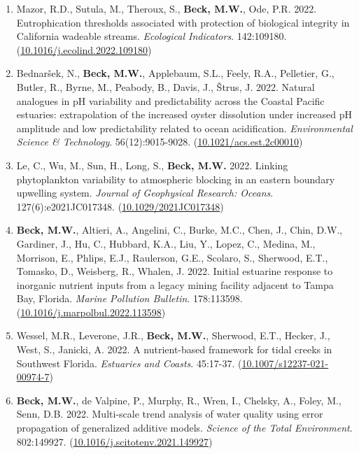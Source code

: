 \documentclass[letterpaper,12pt]{article}
\begin{document}
\begin{enumerate}
\item Mazor, R.D., Sutula, M., Theroux, S., \textbf{Beck, M.W.}, Ode, P.R. 2022. Eutrophication thresholds associated with protection of biological integrity in California wadeable streams. \textit{Ecological Indicators}. 142:109180. ({\footnotesize\href{https://doi.org/10.1016/j.ecolind.2022.109180}{10.1016/j.ecolind.2022.109180}})

\item Bednar\v{s}ek, N., \textbf{Beck, M.W.}, Applebaum, S.L., Feely, R.A., Pelletier, G., Butler, R., Byrne, M., Peabody, B., Davis, J., \v{S}trus, J. 2022. Natural analogues in p{H} variability and predictability across the {C}oastal {P}acific estuaries: extrapolation of the increased oyster dissolution under increased p{H} amplitude and low predictability related to ocean acidification. \textit{Environmental Science \& Technology}. 56(12):9015-9028. ({\footnotesize\href{https://doi.org/10.1021/acs.est.2c00010}{10.1021/acs.est.2c00010}})

\item Le, C., Wu, M., Sun, H., Long, S., \textbf{Beck, M.W.} 2022. Linking phytoplankton variability to atmospheric blocking in an eastern boundary upwelling system. \textit{Journal of Geophysical Research: Oceans}. 127(6):e2021JC017348. ({\footnotesize\href{https://doi.org/10.1029/2021JC017348}{10.1029/2021JC017348}})

\item \textbf{Beck, M.W.}, Altieri, A., Angelini, C., Burke, M.C., Chen, J., Chin, D.W., Gardiner, J., Hu, C., Hubbard, K.A., Liu, Y., Lopez, C., Medina, M., Morrison, E., Phlips, E.J., Raulerson, G.E., Scolaro, S., Sherwood, E.T., Tomasko, D., Weisberg, R., Whalen, J. 2022. Initial estuarine response to inorganic nutrient inputs from a legacy mining facility adjacent to Tampa Bay, Florida. \textit{Marine Pollution Bulletin}. 178:113598. ({\footnotesize\href{https://doi.org/10.1016/j.marpolbul.2022.113598}{10.1016/j.marpolbul.2022.113598}})

\item Wessel, M.R., Leverone, J.R., \textbf{Beck, M.W.}, Sherwood, E.T., Hecker, J., West, S., Janicki, A. 2022. A nutrient-based framework for tidal creeks in Southwest Florida. \textit{Estuaries and Coasts}. 45:17-37. ({\footnotesize\href{https://doi.org/10.1007/s12237-021-00974-7}{10.1007/s12237-021-00974-7}})

\item \textbf{Beck, M.W.}, de Valpine, P., Murphy, R., Wren, I., Chelsky, A., Foley, M., Senn, D.B. 2022. Multi-scale trend analysis of water quality using error propagation of generalized additive models. \textit{Science of the Total Environment}. 802:149927. ({\footnotesize\href{https://doi.org/10.1016/j.scitotenv.2021.149927}{10.1016/j.scitotenv.2021.149927}})


\end{enumerate}
\end{document}
